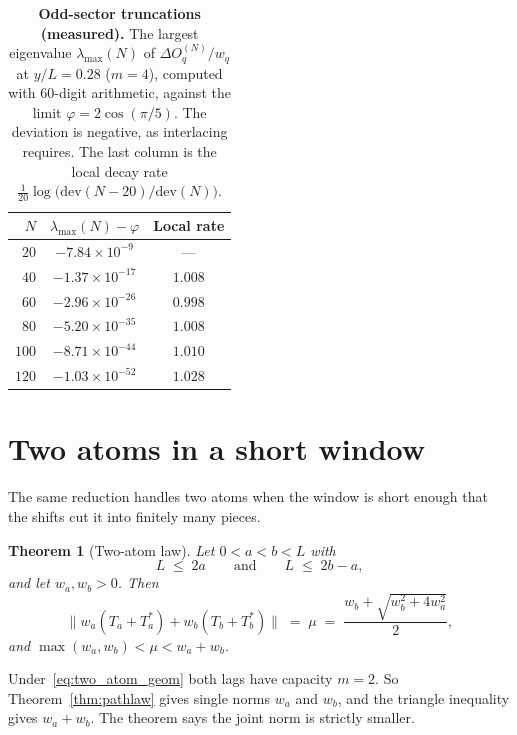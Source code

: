 \documentclass[11pt,a4paper]{article}
\theoremstyle{plain}
\newtheorem{theorem}{Theorem}[section]
\theoremstyle{definition}
\theoremstyle{remark}
\begin{document}
\begin{table}[htbp]
\centering
\small
\caption{\textbf{Odd-sector truncations (measured).} The largest eigenvalue $\lambda_{\max}(N)$ of $\Delta O_q^{(N)}/w_q$ at $y/L = 0.28$ ($m = 4$), computed with $60$-digit arithmetic, against the limit $\varphi = 2\cos(\pi/5)$. The deviation is negative, as interlacing requires. The last column is the local decay rate $\frac{1}{20}\log\bigl(\mathrm{dev}(N-20)/\mathrm{dev}(N)\bigr)$.}\label{tab:hp_rate}
\vspace{0.5em}
\begin{tabular}{rcc}
\toprule
\textbf{$N$} & \textbf{$\lambda_{\max}(N) - \varphi$} & \textbf{Local rate} \\
\midrule
$20$ & $-7.84 \times 10^{-9}$ & --- \\
$40$ & $-1.37 \times 10^{-17}$ & $1.008$ \\
$60$ & $-2.96 \times 10^{-26}$ & $0.998$ \\
$80$ & $-5.20 \times 10^{-35}$ & $1.008$ \\
$100$ & $-8.71 \times 10^{-44}$ & $1.010$ \\
$120$ & $-1.03 \times 10^{-52}$ & $1.028$ \\
\bottomrule
\end{tabular}
\end{table}

\section{Two atoms in a short window}\label{sec:two_atom}

The same reduction handles two atoms when the window is short enough that the shifts cut it into finitely many pieces.

\begin{theorem}[Two-atom law]\label{thm:two_atom}
Let $0 < a < b < L$ with
\begin{equation}\label{eq:two_atom_geom}
  L \;\le\; 2a \qquad\text{and}\qquad L \;\le\; 2b - a ,
\end{equation}
and let $w_a, w_b > 0$. Then
\[
  \bigl\| w_a(T_a + T_a^{*}) + w_b(T_b + T_b^{*}) \bigr\| \;=\; \mu \;=\; \frac{w_b + \sqrt{w_b^2 + 4 w_a^2}}{2},
\]
and $\max(w_a, w_b) < \mu < w_a + w_b$.
\end{theorem}

Under~\eqref{eq:two_atom_geom} both lags have capacity $m = 2$. So Theorem~\ref{thm:pathlaw} gives single norms $w_a$ and $w_b$, and the triangle inequality gives $w_a + w_b$. The theorem says the joint norm is strictly smaller.
\end{document}
